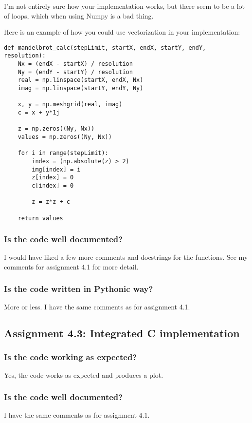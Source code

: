 \documentclass[a4paper]{article}
\begin{document}
I'm not entirely sure how your implementation works, but there seem to be a lot of loops, which when using Numpy is a bad thing.

Here is an example of how you could use vectorization in your implementation:

\begin{verbatim}
def mandelbrot_calc(stepLimit, startX, endX, startY, endY, resolution):
    Nx = (endX - startX) / resolution
    Ny = (endY - startY) / resolution
    real = np.linspace(startX, endX, Nx)
    imag = np.linspace(startY, endY, Ny)

    x, y = np.meshgrid(real, imag)
    c = x + y*1j

    z = np.zeros((Ny, Nx))
    values = np.zeros((Ny, Nx))

    for i in range(stepLimit):
        index = (np.absolute(z) > 2)
        img[index] = i
        z[index] = 0
        c[index] = 0

        z = z*z + c

    return values
\end{verbatim}


\subsubsection*{Is the code well documented?}
 I would have liked a few more comments and docstrings for the functions. See my comments for assignment 4.1 for more detail.

\subsubsection*{Is the code written in Pythonic way?}
More or less. I have the same comments as for assignment 4.1.



\subsection*{Assignment 4.3: Integrated C implementation}

\subsubsection*{Is the code working as expected?}
Yes, the code works as expected and produces a plot.

\subsubsection*{Is the code well documented?}
I have the same comments as for assignment 4.1.
\end{document}
